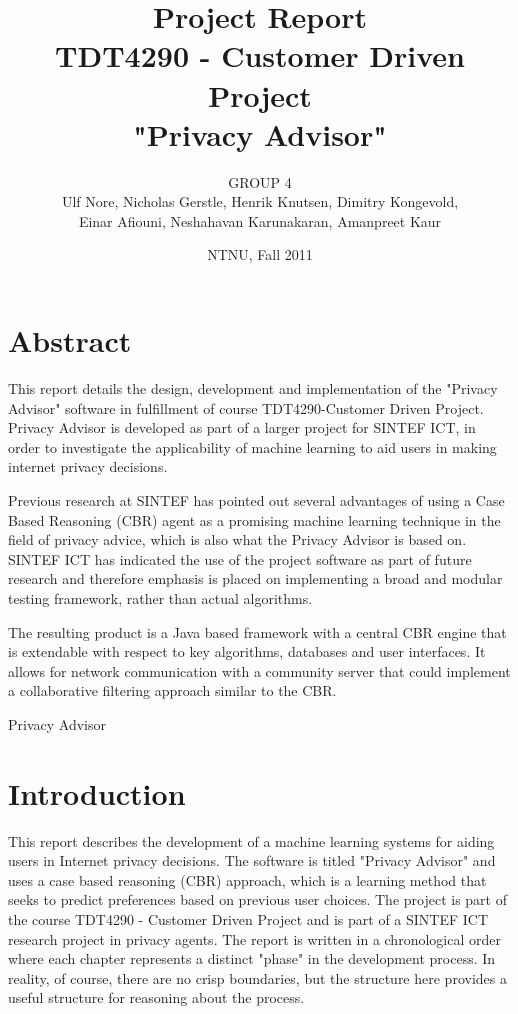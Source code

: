 \documentclass[11pt]{book}
\title{Project Report\\
TDT4290 - Customer Driven Project \\ 
"Privacy Advisor"}
\author{GROUP 4\\
Ulf Nore, Nicholas Gerstle, Henrik Knutsen, Dimitry Kongevold,\\ 
Einar Afiouni, Neshahavan Karunakaran, Amanpreet Kaur}
\date{NTNU, Fall 2011}
\begin{document}
\dominitoc 

\frontmatter
\maketitle

\chapter*{\centering Abstract}
This report details the design, development and implementation of the
"Privacy Advisor" software in fulfillment of course TDT4290-Customer
Driven Project. Privacy Advisor is developed as part of a larger project for SINTEF ICT, in
order to investigate the applicability of machine learning to aid users in
making internet privacy decisions. 

Previous research at SINTEF has pointed
out several advantages of using a Case Based Reasoning (CBR) agent as
a promising machine learning technique in the field of privacy advice,
which is also what the Privacy Advisor is based on. SINTEF ICT
has indicated the use of the project software as part of future
research and therefore emphasis is placed on implementing a broad
and modular testing framework, rather than actual algorithms.

The resulting product is a Java based framework with a central CBR
engine that is extendable with respect to key algorithms, databases
and user interfaces. It allows for network communication with a
community server that could implement a collaborative filtering approach 
similar to the CBR.

Privacy Advisor 




\listoftables

\listoffigures

\tableofcontents \label{toc}



\chapter{Introduction}

This report describes the development of a machine learning systems for aiding users in Internet privacy decisions. The software is titled "Privacy Advisor" and uses a case based reasoning (CBR) approach, which is a learning method that seeks to predict preferences based on previous user choices. The project is part of the course TDT4290 - Customer Driven Project and is part of a SINTEF ICT research project in privacy agents. The report is written in a chronological order where each chapter represents a distinct "phase" in the development process. In reality, of course, there are no crisp boundaries, but the structure here provides a useful structure for reasoning about the process. 
\end{document}
